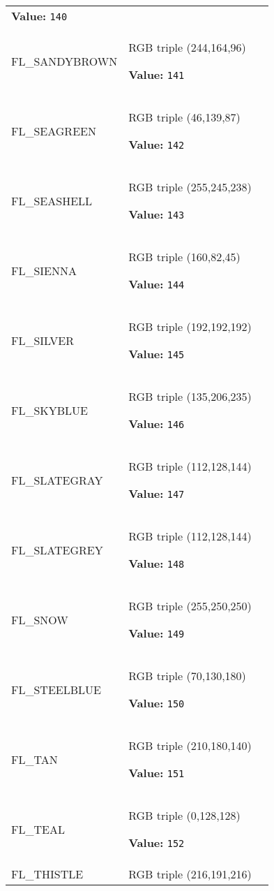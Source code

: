 \begin{longtable}{|p{\varnamewidth}|p{\vardescrwidth}|l}
\textbf{Value:} 
{\tt 140}&\\
\cline{1-2}
\raggedright F\-L\-\_\-S\-A\-N\-D\-Y\-B\-R\-O\-W\-N\- & \raggedright RGB triple (244,164,96)

\textbf{Value:} 
{\tt 141}&\\
\cline{1-2}
\raggedright F\-L\-\_\-S\-E\-A\-G\-R\-E\-E\-N\- & \raggedright RGB triple (46,139,87)

\textbf{Value:} 
{\tt 142}&\\
\cline{1-2}
\raggedright F\-L\-\_\-S\-E\-A\-S\-H\-E\-L\-L\- & \raggedright RGB triple (255,245,238)

\textbf{Value:} 
{\tt 143}&\\
\cline{1-2}
\raggedright F\-L\-\_\-S\-I\-E\-N\-N\-A\- & \raggedright RGB triple (160,82,45)

\textbf{Value:} 
{\tt 144}&\\
\cline{1-2}
\raggedright F\-L\-\_\-S\-I\-L\-V\-E\-R\- & \raggedright RGB triple (192,192,192)

\textbf{Value:} 
{\tt 145}&\\
\cline{1-2}
\raggedright F\-L\-\_\-S\-K\-Y\-B\-L\-U\-E\- & \raggedright RGB triple (135,206,235)

\textbf{Value:} 
{\tt 146}&\\
\cline{1-2}
\raggedright F\-L\-\_\-S\-L\-A\-T\-E\-G\-R\-A\-Y\- & \raggedright RGB triple (112,128,144)

\textbf{Value:} 
{\tt 147}&\\
\cline{1-2}
\raggedright F\-L\-\_\-S\-L\-A\-T\-E\-G\-R\-E\-Y\- & \raggedright RGB triple (112,128,144)

\textbf{Value:} 
{\tt 148}&\\
\cline{1-2}
\raggedright F\-L\-\_\-S\-N\-O\-W\- & \raggedright RGB triple (255,250,250)

\textbf{Value:} 
{\tt 149}&\\
\cline{1-2}
\raggedright F\-L\-\_\-S\-T\-E\-E\-L\-B\-L\-U\-E\- & \raggedright RGB triple (70,130,180)

\textbf{Value:} 
{\tt 150}&\\
\cline{1-2}
\raggedright F\-L\-\_\-T\-A\-N\- & \raggedright RGB triple (210,180,140)

\textbf{Value:} 
{\tt 151}&\\
\cline{1-2}
\raggedright F\-L\-\_\-T\-E\-A\-L\- & \raggedright RGB triple (0,128,128)

\textbf{Value:} 
{\tt 152}&\\
\cline{1-2}
\raggedright F\-L\-\_\-T\-H\-I\-S\-T\-L\-E\- & \raggedright RGB triple (216,191,216)


\end{longtable}
